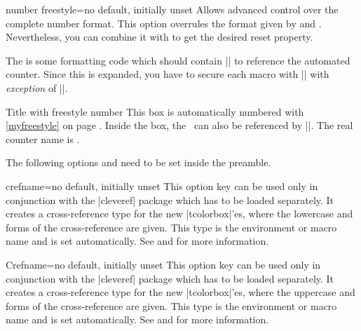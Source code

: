 \begin{newTcbKey}{number freestyle}{=}{no default, initially unset}
Allows advanced control over the complete number format. This option overrules
the format given by  and .
Nevertheless, you can combine it with  to
get the desired reset property.\par
The  is some formatting code which should contain |\tcbcounter| to
reference the automated counter. Since this  is expanded, you have
to secure each macro with |\noexpand| with \emph{exception} of |\tcbcounter|.


\begin{dispExample}
\begin{phbox}[label={myfreestyle}]{Title with freestyle number}
This box is automatically numbered with \ref{myfreestyle} on page
\pageref{myfreestyle}. Inside the box, the \thetcbcounter\ can
also be referenced by |\thetcbcounter|.
The real counter name is \texttt{\tcbcounter}.
\end{phbox}
\end{dispExample}
\end{newTcbKey}

\clearpage
\begin{marker}
The following options  and 
need to be set inside the preamble.
\end{marker}

\begin{newTcbKey}[][doc updated=2014-12-01]{crefname}{=}{no default, initially unset}
  This option key can be used only in conjunction with the |cleveref| package
  \cite{cubitt:2018a} which has to be loaded separately.
  It creates a cross-reference type for the new |tcolorbox|'es, where the
  lowercase  and  forms of the cross-reference are given.
  This type is the environment or macro name and  is set automatically.
  See  and \cite{cubitt:2018a} for more information.
\end{newTcbKey}


\begin{newTcbKey}[][doc updated=2014-12-01]{Crefname}{=}{no default, initially unset}
  This option key can be used only in conjunction with the |cleveref| package
  \cite{cubitt:2018a} which has to be loaded separately.
  It creates a cross-reference type for the new |tcolorbox|'es, where the
  uppercase  and  forms of the cross-reference are given.
  This type is the environment or macro name and  is set automatically.
  See  and \cite{cubitt:2018a} for more information.
\end{newTcbKey}


